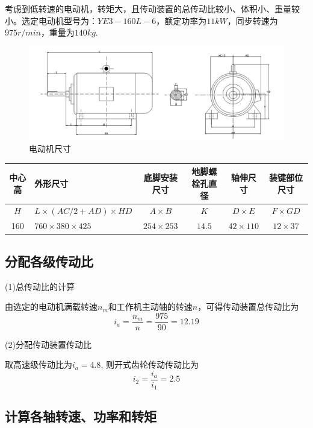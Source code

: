 考虑到低转速的电动机，转矩大，且传动装置的总传动比较小、体积小、重量较小。选定电动机型号为：$YE3-160L-6$，额定功率为$11kW$，同步转速为$975r/min$，重量为$140kg$.

\begin{figure}[h]
    \centering
    \includegraphics[scale=0.5]{graphic/3-1.png}
    \caption{电动机尺寸}
\end{figure}

\begin{tabular}{|c|p{8em}|c|c|c|c|}
    \hline
    中心高 & 外形尺寸                        & 底脚安装尺寸    & 地脚螺栓孔直径 & 轴伸尺寸        & 装键部位尺寸    \\
    \hline
    $H$    & $L\times (AC/2+AD)\times HD$    & $A\times B$     & $K$            & $D\times E$     & $F\times GD$    \\
    \hline
    160    & $760\times 380\times 425      $ & $254\times 253$ & $14.5      $   & $42\times 110 $ & $12\times 37  $ \\
    \hline
\end{tabular}

\subsection{分配各级传动比}
(1)总传动比的计算

由选定的电动机满载转速$n_m$和工作机主动轴的转速$n$，可得传动装置总传动比为
\begin{equation}
    i_a = \frac{n_m}{n} = \frac{975}{90} = 12.19
\end{equation}

(2)分配传动装置传动比

取高速级传动比为$i_a = 4.8 $, 则开式齿轮传动传动比为
\begin{equation}
    i_2 = \frac{i_a}{i_1}=2.5
\end{equation}

\subsection{计算各轴转速、功率和转矩}
